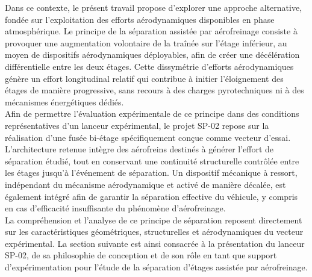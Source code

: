 Dans ce contexte, le présent travail propose d’explorer une approche alternative, fondée sur l’exploitation des efforts
aérodynamiques disponibles en phase atmosphérique. Le principe de la séparation assistée par aérofreinage consiste à provoquer
une augmentation volontaire de la traînée sur l’étage inférieur, au moyen de dispositifs aérodynamiques déployables, afin de
créer une décélération différentielle entre les deux étages. Cette dissymétrie d’efforts aérodynamiques génère un effort
longitudinal relatif qui contribue à initier l’éloignement des étages de manière progressive, sans recours à des charges
pyrotechniques ni à des mécanismes énergétiques dédiés.\\

Afin de permettre l’évaluation expérimentale de ce principe dans des conditions représentatives d’un lanceur expérimental, le
projet SP-02 repose sur la réalisation d’une fusée bi-étage spécifiquement conçue comme vecteur d’essai. L’architecture retenue
intègre des aérofreins destinés à générer l’effort de séparation étudié, tout en conservant une continuité structurelle contrôlée
entre les étages jusqu’à l’événement de séparation. Un dispositif mécanique à ressort, indépendant du mécanisme aérodynamique et
activé de manière décalée, est également intégré afin de garantir la séparation effective du véhicule, y compris en cas
d’efficacité insuffisante du phénomène d’aérofreinage.\\

La compréhension et l’analyse de ce principe de séparation reposent directement sur les caractéristiques géométriques,
structurelles et aérodynamiques du vecteur expérimental. La section suivante est ainsi consacrée à la présentation du lanceur
SP-02, de sa philosophie de conception et de son rôle en tant que support d’expérimentation pour l’étude de la séparation
d’étages assistée par aérofreinage.

\newpage
